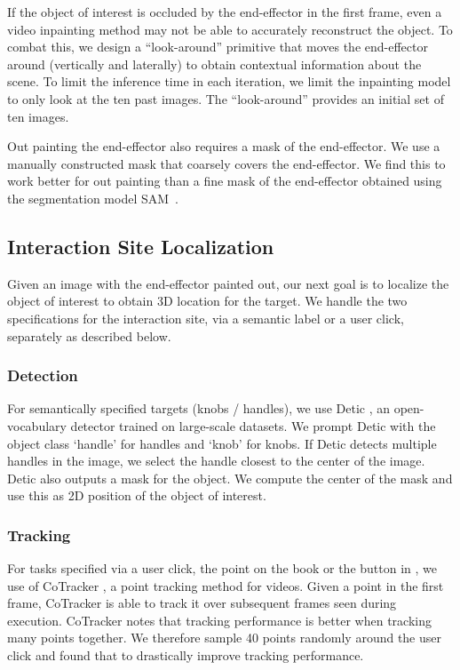 If the object of interest is occluded by the end-effector in the first frame,
even a video inpainting method may not be able to accurately reconstruct the
object. To combat this, we design a ``look-around'' primitive that moves the
end-effector around (vertically and laterally) to obtain contextual information
about the scene. To limit the inference time in each iteration, we limit the
inpainting model to only look at the ten past images.  The ``look-around''
provides an initial set of ten images. 

Out painting the end-effector also requires a mask
of the end-effector.  We use a manually constructed mask that coarsely
covers the end-effector.  We find this to work better for out painting than a
fine mask of the end-effector obtained using the segmentation model
SAM~\cite{kirillov2023segment}.


\subsection{Interaction Site Localization}
Given an image with the end-effector painted out, our next goal is to localize
the object of interest to obtain 3D location for the target. We handle the two
specifications for the interaction site, via a semantic label or a user click,
separately as described below.

\subsubsection{Detection}
For semantically specified targets (\eg knobs / handles), we use Detic
\cite{zhou2022detecting}, an open-vocabulary detector trained on large-scale
datasets. We prompt Detic with the object class `handle' for handles and `knob'
for knobs.
If Detic detects multiple handles in the image, we select the handle closest to
the center of the image. Detic also outputs a mask for the object.  We compute the
center of the mask and use this as 2D position of the object of interest.

\subsubsection{Tracking}
For tasks specified via a user click, \eg the point on the book or the button in , we use of CoTracker \cite{karaev2023cotracker}, a
point tracking method for videos. Given a point in the first frame, CoTracker
is able to track it over subsequent frames seen during execution. CoTracker
notes that tracking performance is better when tracking many points together.
We therefore sample 40 points randomly around the user click and found that to
drastically improve tracking performance.



